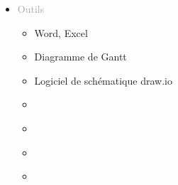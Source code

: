 \documentclass{article}
\begin{document}
\begin{tabular}
\begin{itemize}
        \setlength{\itemsep}{10pt}
        \item \textcolor{darkGray}{Outils}
        \begin{itemize}
        [label={\textcolor{gray!100}{\checkmark}}, topsep=8pt, partopsep=0pt, itemsep=0.5pt, parsep=2pt,after=\vspace*{-\baselineskip}] 
            \item \textcolor{gray!100}{Word, Excel}
            \item \textcolor{gray!100}{Diagramme de Gantt}
            \item \textcolor{gray!100}{Logiciel de schématique draw.io}
            \item[\textcolor{white}{\checkmark}] \textcolor{gray!100}{} %
            \item[\textcolor{white}{\checkmark}] \textcolor{gray!100}{} %
            \item[\textcolor{white}{\checkmark}] \textcolor{gray!100}{} %
            \item[\textcolor{white}{\checkmark}] \textcolor{gray!100}{} %
        \end{itemize}
    \end{itemize}
\end{tabular}

\vfill %


\newpage
\end{document}
